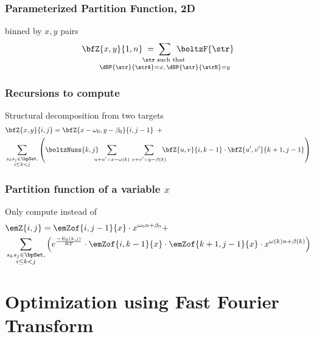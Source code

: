 \documentclass{beamer}
\begin{document}
\begin{frame}
  \frametitle{Parameterized Partition Function, 2D}
  \begin{block}{\bfZ{}{} binned by $x,y$ pairs}
  \begin{align*}
  \bfZ{x,y}{1,n}\;=\;
  \sum_{\mathclap{\substack{
  \str \text{ such that } \rule[-.5ex]{0pt}{0pt} \\
  \dBP{\str}{\strA} = x,\,\dBP{\str}{\strB} = y}}}\enspace
  \boltzF{\str}
  \end{align*}
  \end{block}
\end{frame}

\begin{frame}
  \frametitle{Recursions to compute }
  \begin{block}{Structural decomposition from two targets}
  \begin{align*}
    \begin{split}
  & \bfZ{x,y}{i,j} = \bfZ{x- \omega_0,y-\beta_0}{i,j-1}\enspace + \\
  & \sum_{\substack{s_k s_j \in \bpSet, \\ i \le k<j}}
  \left(
  \boltzNuss{k,j}\quad
  \sum_{\mathclap{u+u'=x- \omega(k)}}\hspace{3.75em}
  \sum_{\mathclap{v+v'=y-\beta(k)}}\quad
  \bfZ{u,v}{i,k-1} \cdot \bfZ{u',v'}{k+1,j-1}
  \right)
  \end{split}
  \end{align*}
  \end{block}
\end{frame}

\begin{frame}
  \frametitle{Partition function of a variable $x$}
  \begin{block}{Only compute  instead of }
  \begin{align*}
    \begin{split}
  & \emZ{i,j} = \emZof{i,j-1}{x} \cdot x^{ \omega_0n+\beta_0} + \\
  &\sum_{\substack{s_k s_j \in \bpSet,\\i\le k<j}}
  \left(e^{\frac{-E_0(k,j)}{RT}}\cdot
  \emZof{i,k-1}{x} \cdot \emZof{k+1,j-1}{x}\cdot x^{ \omega(k)n+\beta(k)} \right)
  \end{split}
  \end{align*}
  \end{block}
\end{frame}

\section{Optimization using Fast Fourier Transform}
\end{document}
